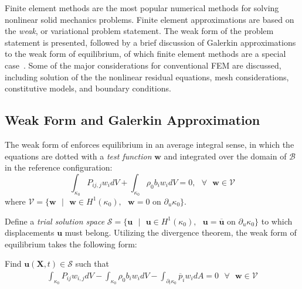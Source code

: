 Finite element methods are the most popular numerical methods for solving nonlinear solid mechanics problems. Finite element approximations are based on the \textit{weak}, or variational problem statement. The weak form of the problem statement is presented, followed by a brief discussion of Galerkin approximations to the weak form of equilibrium, of which finite element methods are a special case~\cite{rashid_2017}. Some of the major considerations for conventional FEM are discussed, including solution of the the nonlinear residual equations, mesh considerations, constitutive models, and boundary conditions.

\subsection{Weak Form and Galerkin Approximation}

The weak form of  enforces equilibrium in an average integral sense, in which the equations are dotted with a \textit{test function} $\bm{w}$ and integrated over the domain of $\mathcal{B}$ in the reference configuration:
\begin{equation}
\int_{\kappa_0}{P_{ij,j}}w_idV + \int_{\kappa_0}\rho_0b_iw_idV = 0, \text{\ \ } \forall \text{\ \ } \bm{w} \in \mathcal{V}
\end{equation}
where $\mathcal{V} = \lbrace\bm{w} \text{\ }|\text{\ } \bm{w} \in H^1(\kappa_0), \text{\ }\bm{w} = 0 \text{\ on\ } \partial_u\kappa_0\rbrace$.

Define a \textit{trial solution space} $\mathcal{S} = \lbrace\bm{u} \text{\ }|\text{\ } \bm{u} \in H^1(\kappa_0), \text{\ }\bm{u} = \overline{\bm{u}} \text{\ on\ } \partial_u\kappa_0\rbrace$  to which displacements $\bm{u}$ must belong. Utilizing the divergence theorem, the weak form of equilibrium takes the following form:

Find $\bm{u}(\bm{X},t) \in \mathcal{S}$ such that
\begin{gather}
\int_{\kappa_0}P_{ij}w_{i,j}dV - \int_{\kappa_0}\rho_0b_iw_idV - \int_{\partial_t\kappa_0}\overline{p}_iw_idA = 0 \text{\ \ } \forall \text{\ \ } \bm{w} \in \mathcal{V}
\end{gather}

